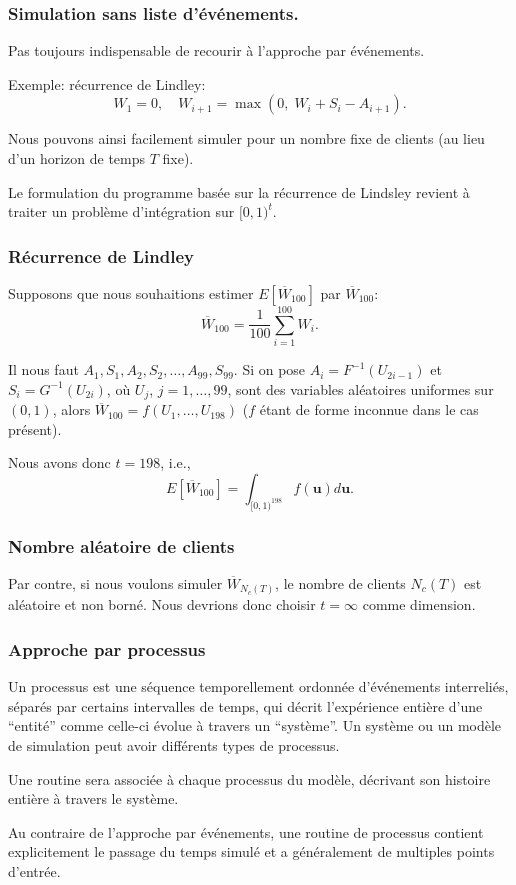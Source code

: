 \documentclass[t,usepdftitle=false]{beamer}
\def\bu{\boldsymbol{u}}
\begin{document}
\begin{frame}
\frametitle{Simulation sans liste d'événements.}

Pas toujours indispensable de recourir à l'approche par événements.

\mbox{}

Exemple: récurrence de Lindley:
\[
 W_1 = 0,\quad W_{i+1} = \max(0,\; W_i + S_i - A_{i+1}).
\]

Nous pouvons ainsi facilement simuler pour un nombre fixe de clients (au lieu d'un horizon de temps $T$ fixe).

\mbox{}

Le formulation du programme basée sur la récurrence de Lindsley revient à traiter un problème d'intégration sur $[0,1)^t$.

\end{frame}

\begin{frame}
\frametitle{Récurrence de Lindley}

Supposons que nous souhaitions estimer $E[\overline{W}_{100}]$ par
${\overline{W}_{100}}$:
\[
{\overline{W}_{100}} = \frac{1}{100} \sum_{i=1}^{100} W_i.
\]

\mbox{}

Il nous faut $A_1, S_1, A_2, S_2, \dots, A_{99}, S_{99}$.
Si on pose ${A_i} = F^{-1}(U_{2i-1})$ et ${S_i} = G^{-1}(U_{2i})$, où
$U_j$, $j = 1,\ldots,99$, sont des variables aléatoires uniformes sur
$(0,1)$, alors $\overline{W}_{100} = f(U_1,\dots,U_{198})$ ($f$ étant de
forme inconnue dans le cas présent).

\mbox{}

Nous avons donc $t=198$, i.e., 
\[
  E[\overline{W}_{100}] = \int_{[0,1)^{198}} f(\bu)d\bu.
\]

\end{frame}

\begin{frame}
\frametitle{Nombre aléatoire de clients}

Par contre, si nous voulons simuler $\overline{W}_{N_c(T)}$, le nombre de clients
$N_c(T)$ est aléatoire et non borné.
Nous devrions donc choisir $t=\infty$ comme dimension.

\end{frame}

\begin{frame}
\frametitle{Approche par processus}

Un processus est une séquence temporellement ordonnée d'événements interreliés, séparés par certains intervalles de temps,
qui décrit l'expérience entière d'une ``entité'' comme celle-ci évolue à travers un ``système''.
Un système ou un modèle de simulation peut avoir différents types de
processus.

\mbox{}

Une routine sera associée à chaque processus du modèle, décrivant son
histoire entière à travers le système.

\mbox{}

Au contraire de l'approche par événements, une routine de processus
contient explicitement le passage du temps simulé et a généralement de
multiples points d'entrée.

\end{frame}
\end{document}
